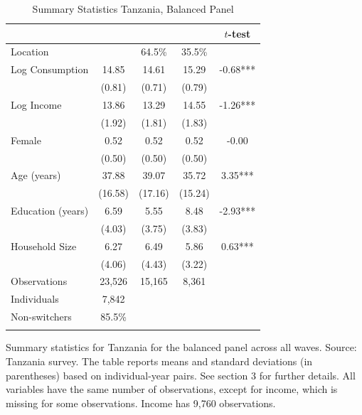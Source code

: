 \begin{table}[htbp] \centering \caption{Summary Statistics Tanzania, Balanced Panel}\label{tab:summary_stats_TZA_bal} \begin{threeparttable} \begin{tabular}{l cccc} \toprule
 &  &  &  & $t$-test \\
\midrule
Location &  &   64.5\% &   35.5\% &  \\  \addlinespace \addlinespace
Log Consumption & 14.85 & 14.61 & 15.29 & -0.68*** \\
 & (0.81) & (0.71) & (0.79) &  \\  \addlinespace
Log Income & 13.86 & 13.29 & 14.55 & -1.26*** \\
 & (1.92) & (1.81) & (1.83) &  \\  \addlinespace
Female & 0.52 & 0.52 & 0.52 & -0.00 \\
 & (0.50) & (0.50) & (0.50) &  \\  \addlinespace
Age (years) & 37.88 & 39.07 & 35.72 & 3.35*** \\
 & (16.58) & (17.16) & (15.24) &  \\  \addlinespace
Education (years) & 6.59 & 5.55 & 8.48 & -2.93*** \\
 & (4.03) & (3.75) & (3.83) &  \\  \addlinespace
Household Size & 6.27 & 6.49 & 5.86 & 0.63*** \\
 & (4.06) & (4.43) & (3.22) &  \\  \addlinespace


\cmidrule{2-5}
Observations & 23,526 & 15,165 & 8,361 &  \\  \addlinespace
Individuals & 7,842 &  &  &  \\
Non-switchers &   85.5\% &  &  &  \\  \addlinespace
\bottomrule \end{tabular} \begin{tablenotes}[flushleft] \footnotesize \item{Summary statistics for Tanzania for the balanced panel across all waves. Source: Tanzania survey. The table reports means and standard deviations (in parentheses) based on individual-year pairs. See section 3 for further details. All variables have the same number of observations, except for income, which is missing for some observations. Income has 9,760 observations.} \end{tablenotes} \end{threeparttable} \end{table}